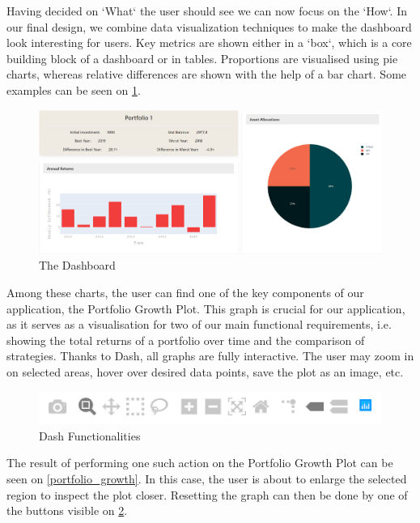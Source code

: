 \documentclass[main.tex]{subfiles}
\begin{document}
Having decided on `What` the user should see we can now focus on the `How`. In our final design, we combine data visualization techniques to make the dashboard look interesting for users. Key metrics are shown either in a `box`, which is a core building block of a dashboard or in tables. Proportions are visualised using pie charts, whereas relative differences are shown with the help of a bar chart. Some examples can be seen on \figurename{\ref{dashboard}}.

\begin{figure}[H]
   \centering
   \includegraphics[width=\textwidth]{04Design/04Pictures/dashboard.png}
   \caption{The Dashboard}
   \label{dashboard}
\end{figure}

Among these charts, the user can find one of the key components of our application, the Portfolio Growth Plot. This graph is crucial for our application, as it serves as a visualisation for two of our main functional requirements, i.e. showing the total returns of a portfolio over time and the comparison of strategies.
Thanks to Dash, all graphs are fully interactive. The user may zoom in on selected areas, hover over desired data points, save the plot as an image, etc.

\begin{figure}[H]
   \centering
   \includegraphics[width=\textwidth]{08Appendices/081User/081Pictures/dash_funcionalities.png}
   \caption{Dash Functionalities}
   \label{dash_functionalities_design}
\end{figure}

The result of performing one such action on the Portfolio Growth Plot can be seen on \figurename{\ref{portfolio_growth}}. In this case, the user is about to enlarge the selected region to inspect the plot closer. Resetting the graph can then be done by one of the buttons visible on \figurename{\ref{dash_functionalities_design}}.
\end{document}
